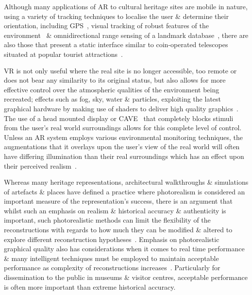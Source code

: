 Although many applications of AR to cultural heritage sites are mobile in nature, using a variety of tracking techniques to localise the user \& determine their orientation, including GPS~\cite{vlahakis:archeoguide}, visual tracking of robust features of the environment~\cite{Kim2009} \& omnidirectional range sensing of a landmark database~\cite{Taketomi2011}, there are also those that present a static interface similar to coin-operated telescopes situated at popular tourist attractions~\cite{Weng2012}.


VR is not only useful where the real site is no longer accessible, too remote or does not bear any similarity to its original status, but also allows for more effective control over the atmospheric qualities of the environment being recreated; effects such as fog, sky, water \& particles, exploiting the latest graphical hardware by making use of shaders to deliver high quality graphics~\cite{deamicis:gamebased}. The use of a head mounted display or CAVE~\cite{cabral:x3dexperience,Christou2006} that completely blocks stimuli from the user's real world surroundings allows for this complete level of control. Unless an AR system employs various environmental monitoring techniques, the augmentations that it overlays upon the user's view of the real world will often have differing illumination than their real surroundings which has an effect upon their perceived realism~\cite{mcnamara:lightness}.

Whereas many heritage representations, architectural walkthroughs \& simulations of artefacts \& places have defined a practice where photorealism is considered an important measure of the representation's success, there is an argument that whilst such an emphasis on realism \& historical accuracy \& authenticity is important, such photorealistic methods can limit the flexibility of the reconstructions with regards to how much they can be modified \& altered to explore different reconstruction hypotheses~\cite{roussou:photorealism}. Emphasis on photorealistic graphical quality also has considerations when it comes to real time performance \& many intelligent techniques must be employed to maintain acceptable performance as complexity of reconstructions increases~\cite{willmott:largecomplex}. Particularly for dissemination to the public in museums \& visitor centres, acceptable performance is often more important than extreme historical accuracy.

